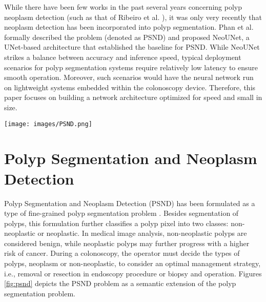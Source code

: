 \documentclass{ieeeaccess}
\begin{document}
While there have been few works in the past several years concerning polyp neoplasm detection (such as that of Ribeiro et al. \cite{ribeiro2016exploring}), it was only very recently that neoplasm detection has been incorporated into polyp segmentation. Phan et al. \cite{lan2021neounet} formally described the problem (denoted as PSND) and proposed NeoUNet, a UNet-based architecture that established the baseline for PSND. While NeoUNet strikes a balance between accuracy and inference speed, typical deployment scenarios for polyp segmentation systems require relatively low latency to ensure smooth operation. Moreover, such scenarios would have the neural network run on lightweight systems embedded within the colonoscopy device. Therefore, this paper focuses on building a network architecture optimized for speed and small in size.



\begin{figure*}[ht!]
    \begin{center}
        \texttt{[image: images/PSND.png]}
    \end{center}
    \caption{PSND is an extension of polyp segmentation, which further discriminates whether a polyp is neoplastic or non-neoplastic. For a given input image shown on the top right corner, expected outputs for polyp segmentation and PSND are depicted on the middle and the bottom images on the right, respectively. The black color denotes background pixels, white color denotes polyp regions; green and red colors denote non-neoplastic and neoplastic polyps, respectively.}
    \label{fig:psnd}
\end{figure*}

\section{Polyp Segmentation and Neoplasm Detection}
\label{sec:problem}

Polyp Segmentation and Neoplasm Detection (PSND) has been formulated as a type of fine-grained polyp segmentation problem \cite{lan2021neounet}. Besides segmentation of polyps, this formulation further classifies a polyp pixel into two classes: non-neoplastic or neoplastic. In medical image analysis, non-neoplastic polyps are considered benign, while neoplastic polyps may further progress with a higher risk of cancer. During a colonoscopy, the operator must decide the types of polyps, neoplasm or non-neoplastic, to consider an optimal management strategy, i.e., removal or resection in endoscopy procedure or biopsy and operation. Figures \ref{fig:psnd} depicts the PSND problem as a semantic extension of the polyp segmentation problem.
\end{document}
